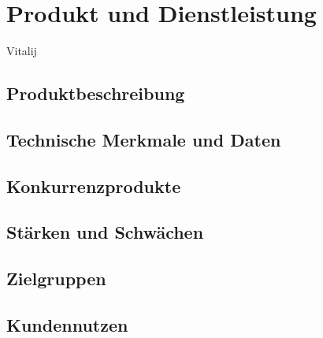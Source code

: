 
\section{Produkt und Dienstleistung}
Vitalij

\subsection{Produktbeschreibung}
\subsection{Technische Merkmale und Daten}
\subsection{Konkurrenzprodukte}
\subsection{Stärken und Schwächen}
\subsection{Zielgruppen}
\subsection{Kundennutzen}
